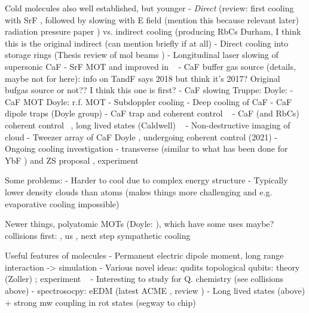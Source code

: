 Cold molecules also well established, but younger
- \emph{Direct} (review: \cite{Tarbutt2018} first cooling with SrF \cite{Shuman2009}, followed by
slowing with E field \cite{Bethlem1999} (mention this because relevant later)
radiation pressure paper \cite{PhysRevLett.108.103002}) vs. indirect cooling
(producing RbCs Durham\cite{PhysRevA.89.033604}, I think this is the original indirect \cite{Moses2017} (can mention briefly if at all)  
- Direct cooling into storage rings (Thesis \cite{Crompvoets2005} review of mol beams \cite{vandeMeerakker2012})
- Longitudinal laser slowing of supersonic CaF \cite{PhysRevA.89.053416}
- SrF MOT \cite{Barry2014} and improved in ~\cite{PhysRevLett.116.063004}
- CaF buffer gas source (details, maybe not for here): \cite{Truppe2018} %
info on TandF says 2018 but think it's 2017? Original bufgas source
\cite{Barry2011} or not?? I think this one is first? \cite{Maxwell2005}
- CaF slowing Truppe: \cite{Truppe2017a} Doyle: \cite{0953-4075-49-17-174001}
- CaF MOT Doyle: r.f. MOT \cite{PhysRevLett.119.103201}
- Subdoppler cooling \cite{Truppe2017}
- Deep cooling of CaF \cite{PhysRevLett.123.033202}
- CaF dipole traps (Doyle group)
- CaF trap and coherent control ~\cite{WilliamsMagnetic2018}
- CaF (and RbCs) coherent control ~\cite{Blackmore_2018}, long lived states
(Caldwell) ~\cite{PhysRevLett.124.063001}
- Non-destructive imaging of cloud \cite{PhysRevLett.121.083201}
- Tweezer array of CaF Doyle \cite{Anderegg2019}, undergoing coherent control
\cite{PhysRevLett.127.123202} (2021)
- Ongoing cooling investigation - transverse (similar to what has been done for
YbF \cite{Alauze2021}) and ZS proposal \cite{Fitch2016}, experiment \cite{PhysRevLett.127.263002}

Some problems:
- Harder to cool due to complex energy structure
- Typically lower density clouds than atoms (makes things more challenging and
e.g. evaporative cooling impossible)

Newer things, polyatomic MOTs (Doyle: \cite{Vilas2021}), which have some uses maybe? ~\cite{DoylePolyatomic2022}
collisions first: \cite{son2019collisional}, us \cite{Jurgilas2021, JurgilasPRL_2021}, next step sympathetic cooling

Useful features of molecules
- Permanent electric dipole moment, long range interaction -> simulation
- Various novel ideas:
   qudits \cite{Sawant_2020}
   topological qubits: theory (Zoller) \cite{Micheli2006};  experiment ~\cite{Gross995}
- Interesting to study for Q. chemistry (see collisions above)
- spectrosocpy: eEDM
(latest ACME \cite{Andreev2018}, review \cite{ACMEreview})
- Long lived states (above) + strong mw coupling in rot states (segway to chip)


